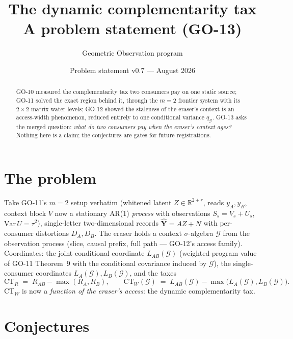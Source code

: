 ﻿\documentclass[11pt]{article}
\title{The dynamic complementarity tax\\[2pt]\large A problem
statement (GO-13)}
\author{Geometric Observation program}
\date{Problem statement v0.7 --- August 2026}
\theoremstyle{remark}
\begin{document}
\maketitle

\begin{abstract}
GO-10 measured the complementarity tax two consumers pay on one static
source; GO-11 solved the exact region behind it, through the $m=2$
frontier system with its $2\times2$ matrix water levels; GO-12 showed
the staleness of the eraser's context is an access-width phenomenon,
reduced entirely to one conditional variance $q_{\mathcal G}$. GO-13
asks the merged question: \emph{what do two consumers pay when the
eraser's context ages?} Nothing here is a claim; the conjectures are
gates for future registrations.
\end{abstract}

\section{The problem}

Take GO-11's $m=2$ setup verbatim (whitened latent $Z\in\mathbb
R^{2+r}$, reads $y_A,y_B$, context block $V$ now a stationary AR(1)
\emph{process} with observations $S_s=V_s+U_s$, $\mathrm{Var}\,U=
\tau^2$), single-letter two-dimensional records
$\hat{\mathbf Y}=AZ+N$ with per-consumer distortions $D_A,D_B$. The
eraser holds a context $\sigma$-algebra $\mathcal G$ from the
observation process (slice, causal prefix, full path --- GO-12's access
family). Coordinates: the joint conditional coordinate
$L_{AB}(\mathcal G)$ (weighted-program value of GO-11 Theorem~9 with
the conditional covariance induced by $\mathcal G$), the single-consumer
coordinates $L_A(\mathcal G),L_B(\mathcal G)$, and the taxes
\[
\mathrm{CT}_R \;=\; R_{AB}-\max(R_A,R_B),\qquad
\mathrm{CT}_W(\mathcal G)\;=\;L_{AB}(\mathcal G)-
\max\bigl(L_A(\mathcal G),L_B(\mathcal G)\bigr).
\]
$\mathrm{CT}_W$ is now a \emph{function of the eraser's access}: the
dynamic complementarity tax.

\section{Conjectures}
\end{document}
